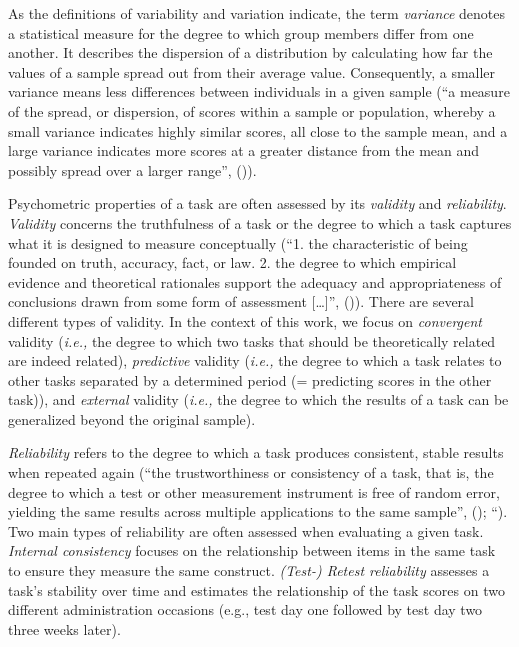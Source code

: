 \documentclass[
]{scrbook}
\begin{document}
As the definitions of variability and variation indicate, the term \emph{variance} denotes a statistical measure for the degree to which group members differ from one another. It describes the dispersion of a distribution by calculating how far the values of a sample spread out from their average value. Consequently, a smaller variance means less differences between individuals in a given sample (``a measure of the spread, or dispersion, of scores within a sample or population, whereby a small variance indicates highly similar scores, all close to the sample mean, and a large variance indicates more scores at a greater distance from the mean and possibly spread over a larger range'', ()).

Psychometric properties of a task are often assessed by its \emph{validity} and \emph{reliability}. \emph{Validity} concerns the truthfulness of a task or the degree to which a task captures what it is designed to measure conceptually (``1. the characteristic of being founded on truth, accuracy, fact, or law. 2. the degree to which empirical evidence and theoretical rationales support the adequacy and appropriateness of conclusions drawn from some form of assessment {[}\ldots{]}'', ()). There are several different types of validity. In the context of this work, we focus on \emph{convergent} validity (\emph{i.e.,} the degree to which two tasks that should be theoretically related are indeed related), \emph{predictive} validity (\emph{i.e.,} the degree to which a task relates to other tasks separated by a determined period (= predicting scores in the other task)), and \emph{external} validity (\emph{i.e.,} the degree to which the results of a task can be generalized beyond the original sample).

\emph{Reliability} refers to the degree to which a task produces consistent, stable results when repeated again (``the trustworthiness or consistency of a task, that is, the degree to which a test or other measurement instrument is free of random error, yielding the same results across multiple applications to the same sample'', (); ``). Two main types of reliability are often assessed when evaluating a given task. \emph{Internal consistency} focuses on the relationship between items in the same task to ensure they measure the same construct. \emph{(Test-) Retest reliability} assesses a task's stability over time and estimates the relationship of the task scores on two different administration occasions (e.g., test day one followed by test day two three weeks later).
\end{document}
